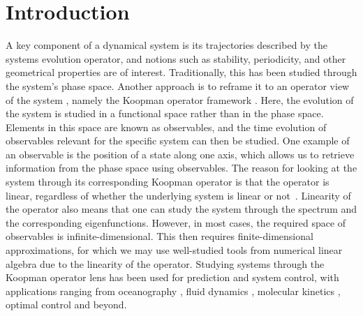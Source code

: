 \documentclass{article}
\begin{document}
\section{Introduction}
A key component of a dynamical system is its trajectories described by the systems evolution operator, and notions such as stability, periodicity, and other geometrical properties are of interest. Traditionally, this has been studied through the system's phase space. Another approach is to reframe it to an operator view of the system \citep{mezic-2004, mezic-2005, mezic-2023}, namely the Koopman operator framework \citep{koopman-1931}. Here, the evolution of the system is studied in a functional space rather than in the phase space. Elements in this space are known as observables, and the time evolution of observables relevant for the specific system can then be studied. One example of an observable is the position of a state along one axis, which allows us to retrieve information from the phase space using observables. The reason for looking at the system through its corresponding Koopman operator is that the operator is linear, regardless of whether the underlying system is linear or not~\citep{budisic-2012}. Linearity of the operator also means that one can study the system through the spectrum and the corresponding eigenfunctions. However, in most cases, the required space of observables is infinite-dimensional. This then requires finite-dimensional approximations, for which we may use well-studied tools from numerical linear algebra due to the linearity of the operator. Studying systems through the Koopman operator lens has been used for prediction and system control, with applications ranging from oceanography \citep{giannakis-2015}, fluid dynamics \citep{mezic-2013, sharma-2016}, molecular kinetics \citep{nuske-2014, nuske-2016}, optimal control \citep{korda-2018b, mamakoukas-2019, bevanda-2022a} and beyond.
\end{document}
